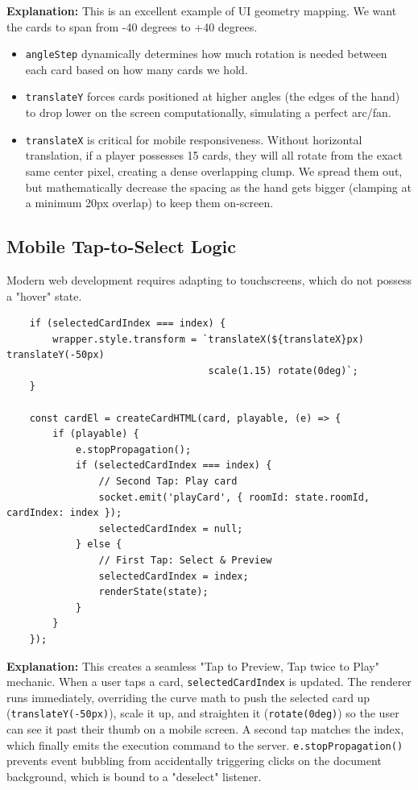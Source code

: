 \documentclass[11pt,a4paper]{article}
\begin{document}
\textbf{Explanation:} 
This is an excellent example of UI geometry mapping. We want the cards to span from -40 degrees to +40 degrees.
\begin{itemize}
    \item \texttt{angleStep} dynamically determines how much rotation is needed between each card based on how many cards we hold.
    \item \texttt{translateY} forces cards positioned at higher angles (the edges of the hand) to drop lower on the screen computationally, simulating a perfect arc/fan.
    \item \texttt{translateX} is critical for mobile responsiveness. Without horizontal translation, if a player possesses 15 cards, they will all rotate from the exact same center pixel, creating a dense overlapping clump. We spread them out, but mathematically decrease the spacing as the hand gets bigger (clamping at a minimum 20px overlap) to keep them on-screen.
\end{itemize}

\subsection{Mobile Tap-to-Select Logic}
Modern web development requires adapting to touchscreens, which do not possess a "hover" state.

\begin{verbatim}
    if (selectedCardIndex === index) {
        wrapper.style.transform = `translateX(${translateX}px) translateY(-50px) 
                                   scale(1.15) rotate(0deg)`;
    }

    const cardEl = createCardHTML(card, playable, (e) => {
        if (playable) {
            e.stopPropagation(); 
            if (selectedCardIndex === index) {
                // Second Tap: Play card
                socket.emit('playCard', { roomId: state.roomId, cardIndex: index });
                selectedCardIndex = null;
            } else {
                // First Tap: Select & Preview
                selectedCardIndex = index;
                renderState(state); 
            }
        }
    });
\end{verbatim}

\textbf{Explanation:}
This creates a seamless "Tap to Preview, Tap twice to Play" mechanic. 
When a user taps a card, \texttt{selectedCardIndex} is updated. The renderer runs immediately, overriding the curve math to push the selected card up (\texttt{translateY(-50px)}), scale it up, and straighten it (\texttt{rotate(0deg)}) so the user can see it past their thumb on a mobile screen. 
A second tap matches the index, which finally emits the execution command to the server. \texttt{e.stopPropagation()} prevents event bubbling from accidentally triggering clicks on the document background, which is bound to a "deselect" listener.
\end{document}
